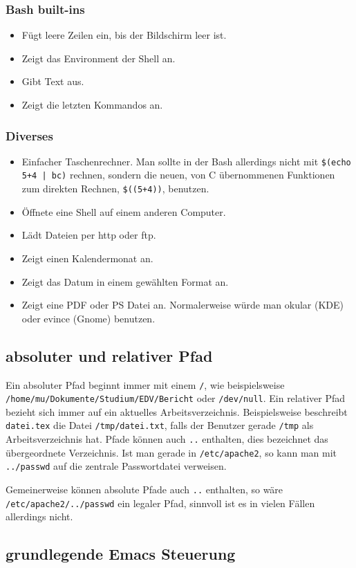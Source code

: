 \documentclass[12pt]{article}
\newcommand\dd[2]{\item[\texttt{#1}] #2}
\begin{document}
\subsubsection{Bash built-ins}
\begin{itemize}
\dd{clear}{Fügt leere Zeilen ein, bis der Bildschirm leer ist.}
\dd{set}{Zeigt das Environment der Shell an.}
\dd{echo}{Gibt Text aus.}
\dd{history}{Zeigt die letzten Kommandos an.}
\end{itemize}

\subsubsection{Diverses}
\begin{itemize}
\dd{bc}{Einfacher Taschenrechner. Man sollte in der Bash allerdings nicht mit \texttt{\$(echo 5+4 | bc)} rechnen, sondern die neuen, von C übernommenen Funktionen zum direkten Rechnen, \texttt{\$((5+4))}, benutzen.}
\dd{ssh}{Öffnete eine Shell auf einem anderen Computer.}
\dd{wget}{Lädt Dateien per http oder ftp.}
\dd{cal}{Zeigt einen Kalendermonat an.}
\dd{date}{Zeigt das Datum in einem gewählten Format an.}
\dd{gv}{Zeigt eine PDF oder PS Datei an. Normalerweise würde man okular (KDE) oder evince (Gnome) benutzen.}
\end{itemize}

\subsection{absoluter und relativer Pfad}

Ein absoluter Pfad beginnt immer mit einem \texttt{/}, wie beispielsweise \\ \texttt{/home/mu/Dokumente/Studium/EDV/Bericht} oder \texttt{/dev/null}. Ein relativer Pfad bezieht sich immer auf ein aktuelles Arbeitsverzeichnis. Beispielsweise beschreibt \texttt{datei.tex} die Datei \texttt{/tmp/datei.txt}, falls der Benutzer gerade \texttt{/tmp} als Arbeitsverzeichnis hat. Pfade können auch \texttt{..} enthalten, dies bezeichnet das übergeordnete Verzeichnis. Ist man gerade in \texttt{/etc/apache2}, so kann man mit \texttt{../passwd} auf die zentrale Passwortdatei verweisen.

Gemeinerweise können absolute Pfade auch \texttt{..} enthalten, so wäre \\
\texttt{/etc/apache2/../passwd} ein legaler Pfad, sinnvoll ist es in vielen Fällen allerdings nicht.

\subsection{grundlegende Emacs Steuerung}
\end{document}
